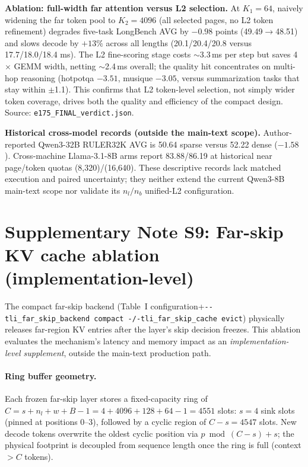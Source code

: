 \documentclass[10pt,letterpaper]{article}
\begin{document}
\textbf{Ablation: full-width far attention versus L2 selection.} At $K_1{=}64$, naively widening the far token pool to $K_2{=}4096$ (all selected pages, no L2 token refinement) degrades five-task LongBench AVG by $-0.98$ points (49.49$\rightarrow$48.51) and slows decode by $+13\%$ across all lengths (20.1/20.4/20.8 versus 17.7/18.0/18.4 ms). The L2 fine-scoring stage costs $\sim$3.3\,ms per step but saves 4$\times$ GEMM width, netting $\sim$2.4\,ms overall; the quality hit concentrates on multi-hop reasoning (hotpotqa $-3.51$, musique $-3.05$, versus summarization tasks that stay within $\pm$1.1). This confirms that L2 token-level selection, not simply wider token coverage, drives both the quality and efficiency of the compact design. Source: \texttt{e175\_FINAL\_verdict.json}.

\textbf{Historical cross-model records (outside the main-text scope).} Author-reported Qwen3-32B RULER32K AVG is 50.64 sparse versus 52.22 dense ($-1.58$). Cross-machine Llama-3.1-8B arms report 83.88/86.19 at historical near page/token quotas (8,320)/(16,640). These descriptive records lack matched execution and paired uncertainty; they neither extend the current Qwen3-8B main-text scope nor validate its $n_l/n_b$ unified-L2 configuration.

\clearpage
\section*{Supplementary Note S9: Far-skip KV cache ablation (implementation-level)}

The compact far-skip backend (Table~I configuration+\texttt{\mbox{-\/-tli\_far\_skip\_backend compact -/-tli\_far\_skip\_cache evict}}) physically releases far-region KV entries after the layer's skip decision freezes. This ablation evaluates the mechanism's latency and memory impact as an \emph{implementation-level supplement}, outside the main-text production path.

\paragraph{Ring buffer geometry.} Each frozen far-skip layer stores a fixed-capacity ring of $C = s + n_l + w + B - 1 = 4 + 4096 + 128 + 64 - 1 = 4551$ slots: \mbox{$s{=}4$} sink slots (pinned at positions 0--3), followed by a cyclic region of $C - s = 4547$ slots.  New decode tokens overwrite the oldest cyclic position via $p \bmod (C - s) + s$; the physical footprint is decoupled from sequence length once the ring is full (context $> C$ tokens).
\end{document}
